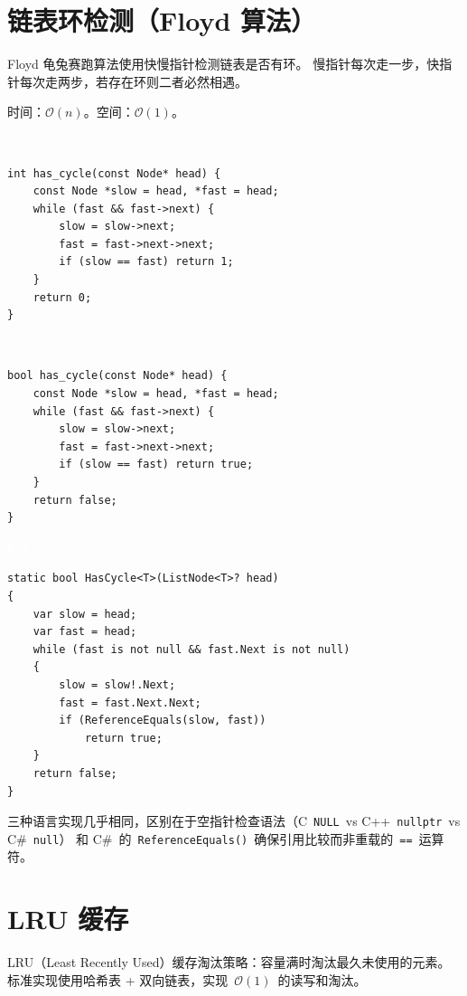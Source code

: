 \documentclass[12pt,a4paper,fontset=fandol]{ctexbook}
\newcommand{\clabel}{%
  \noindent\begin{tcolorbox}[sharp corners,colback=cheadbg,colframe=cheadbg,
    left=6pt,right=6pt,top=2pt,bottom=2pt,boxrule=0pt]
  \textcolor{white}{\small\bfseries\sffamily C}\end{tcolorbox}%
}
\newcommand{\cpplabel}{%
  \noindent\begin{tcolorbox}[sharp corners,colback=cppheadbg,colframe=cppheadbg,
    left=6pt,right=6pt,top=2pt,bottom=2pt,boxrule=0pt]
  \textcolor{white}{\small\bfseries\sffamily C++}\end{tcolorbox}%
}
\newcommand{\csharplabel}{%
  \noindent\begin{tcolorbox}[sharp corners,colback=csharpheadbg,colframe=csharpheadbg,
    left=6pt,right=6pt,top=2pt,bottom=2pt,boxrule=0pt]
  \textcolor{white}{\small\bfseries\sffamily C\#}\end{tcolorbox}%
}
\newcommand{\bigO}[1]{\mathcal{O}(#1)}
\newcommand{\Fn}[1]{\texttt{#1()}}
\begin{document}
\chapter{链表环检测（Floyd 算法）}

Floyd 龟兔赛跑算法使用快慢指针检测链表是否有环。
慢指针每次走一步，快指针每次走两步，若存在环则二者必然相遇。

\begin{complexitybox}
  时间：$\bigO{n}$。空间：$\bigO{1}$。
\end{complexitybox}

\clabel
\begin{lstlisting}[style=cstyle]
int has_cycle(const Node* head) {
    const Node *slow = head, *fast = head;
    while (fast && fast->next) {
        slow = slow->next;
        fast = fast->next->next;
        if (slow == fast) return 1;
    }
    return 0;
}
\end{lstlisting}

\cpplabel
\begin{lstlisting}[style=cppstyle]
bool has_cycle(const Node* head) {
    const Node *slow = head, *fast = head;
    while (fast && fast->next) {
        slow = slow->next;
        fast = fast->next->next;
        if (slow == fast) return true;
    }
    return false;
}
\end{lstlisting}

\csharplabel
\begin{lstlisting}[style=csharpstyle]
static bool HasCycle<T>(ListNode<T>? head)
{
    var slow = head;
    var fast = head;
    while (fast is not null && fast.Next is not null)
    {
        slow = slow!.Next;
        fast = fast.Next.Next;
        if (ReferenceEquals(slow, fast))
            return true;
    }
    return false;
}
\end{lstlisting}

\begin{compare}
三种语言实现几乎相同，区别在于空指针检查语法（C~\texttt{NULL}~vs C++~\texttt{nullptr}~vs C\#~\texttt{null}）
和 C\#~的~\Fn{ReferenceEquals}~确保引用比较而非重载的~\texttt{==}~运算符。
\end{compare}

\chapter{LRU 缓存}

LRU（Least Recently Used）缓存淘汰策略：容量满时淘汰最久未使用的元素。
标准实现使用哈希表 + 双向链表，实现~$\bigO{1}$~的读写和淘汰。
\end{document}
